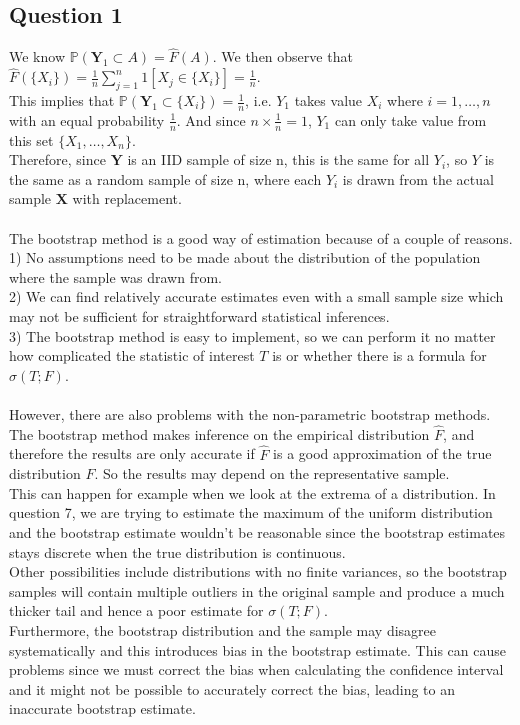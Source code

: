 \documentclass[10pt]{article}
\begin{document}
\subsection*{Question 1}
We know \(\mathds{P}(\mathbf{Y}_1 \subset A)=\hat{F}(A)\). We then observe that $\hat{F}(\{X_i\})=\frac{1}{n}\sum_{j=1}^n 1[X_j \in \{X_i\}]=\frac{1}{n}$. \\
This implies that \(\mathds{P}(\mathbf{Y}_1 \subset \{X_i\})=\frac{1}{n}\), i.e. $Y_1$ takes value $X_i$ where $i=1,\dots,n$ with an equal probability $\frac{1}{n}$. And since $n \times \frac{1}{n}=1$, $Y_1$ can only take value from this set $\{X_1,\dots,X_n\}$.\\
Therefore, since $\mathbf{Y}$ is an IID sample of size n, this is the same for all $Y_i$, so ${Y}$ is the same as a random sample of size n, where each $Y_i$ is drawn from the actual sample $\mathbf{X}$ with replacement.\\\\
\noindent The bootstrap method is a good way of estimation because of a couple of reasons.\\
1) No assumptions need to be made about the distribution of the population where the sample was drawn from.\\
2) We can find relatively accurate estimates even with a small sample size which may not be sufficient for straightforward statistical inferences.\\
3) The bootstrap method is easy to implement, so we can perform it no matter how complicated the statistic of interest $T$ is or whether there is a formula for $\sigma(T;F)$.\\\\
However, there are also problems with the non-parametric bootstrap methods. The bootstrap method makes inference on the empirical distribution $\hat{F}$, and therefore the results are only accurate if $\hat{F}$ is a good approximation of the true distribution $F$. So the results may depend on the representative sample.\\
This can happen for example when we look at the extrema of a distribution. In question 7,  we are trying to estimate the maximum of the uniform distribution and the bootstrap estimate wouldn't be reasonable since the bootstrap estimates stays discrete when the true distribution is continuous.\\
Other possibilities include distributions with no finite variances, so the bootstrap samples will contain multiple outliers in the original sample and produce a much thicker tail and hence a poor estimate for $\sigma(T;F)$.\\
Furthermore, the bootstrap distribution and the sample may disagree systematically and this introduces bias in the bootstrap estimate. This can cause problems since we must correct the bias when calculating the confidence interval and it might not be possible to accurately correct the bias, leading to an inaccurate bootstrap estimate.
\end{document}
